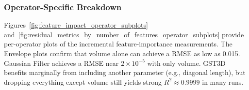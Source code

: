 \subsubsection{Operator-Specific Breakdown}
\label{subsec:operator-specific-breakdown}

Figures~\ref{fig:feature_impact_operator_subplots} and~\ref{fig:residual_metrics_by_number_of_features_operator_subplots} provide per-operator plots of the incremental feature-importance measurements.
The Envelope plots confirm that volume alone can achieve a \ac{RMSE} as low as 0.015.
Gaussian Filter achieves a \ac{RMSE} near \(2\times10^{-5}\) with only volume.
\ac{GST3D} benefits marginally from including another parameter (e.g., diagonal length), but dropping everything except  volume  still yields strong $R^2 \approx 0.9999$ in many runs.

